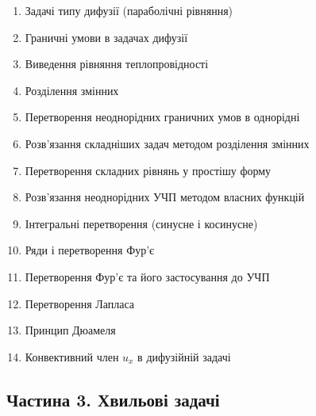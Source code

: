 \documentclass[
  ukrainian,
]{article}
\providecommand{\tightlist}{%
  \setlength{\itemsep}{0pt}\setlength{\parskip}{0pt}}
\begin{document}
\begin{enumerate}
\def\labelenumi{\arabic{enumi}.}
\setcounter{enumi}{1}
\tightlist
\item
  Задачі типу дифузії (параболічні рівняння)
\item
  Граничні умови в задачах дифузії
\item
  Виведення рівняння теплопровідності
\item
  Розділення змінних
\item
  Перетворення неоднорідних граничних умов в однорідні
\item
  Розв'язання складніших задач методом розділення змінних
\item
  Перетворення складних рівнянь у простішу форму
\item
  Розв'язання неоднорідних УЧП методом власних функцій
\item
  Інтегральні перетворення (синусне і косинусне)
\item
  Ряди і перетворення Фур'є
\item
  Перетворення Фур'є та його застосування до УЧП
\item
  Перетворення Лапласа
\item
  Принцип Дюамеля
\item
  Конвективний член \(u_x\) в дифузійній задачі
\end{enumerate}

\subsection{Частина 3. Хвильові
задачі}\label{ux447ux430ux441ux442ux438ux43dux430-3.-ux445ux432ux438ux43bux44cux43eux432ux456-ux437ux430ux434ux430ux447ux456}
\end{document}
